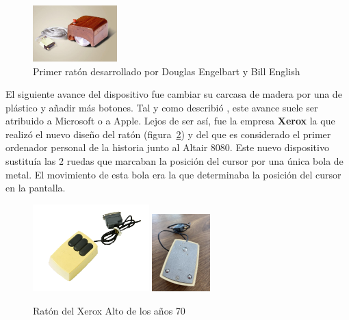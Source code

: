 \begin{figure}[t]
\centering
\includegraphics[width=0.29\textwidth]{./Imagenes/Bitmap/Primer_raton.jpg}
\caption{Primer rat\'on desarrollado por Douglas Engelbart y Bill English}
\label{Fig:primerraton}
\end{figure}

El siguiente avance del dispositivo fue cambiar su carcasa de madera por una de pl\'astico y a\~nadir m\'as botones. Tal y como describi\'o \cite{xerox}, este avance suele ser atribuido a Microsoft o a Apple. Lejos de ser as\'i, fue la empresa \textbf{Xerox} la que realiz\'o el nuevo dise\~no del rat\'on (figura~\ref{Fig:xerox}) y del que es considerado el primer ordenador personal de la historia junto al Altair 8080. Este nuevo dispositivo sustitu\'ia las 2 ruedas que marcaban la posici\'on del cursor por una \'unica bola de metal. El movimiento de esta bola era la que determinaba la posici\'on del cursor en la pantalla. \\

\begin{figure}[t]
\begin{minipage}{0.9\textwidth}
    \centering
    \includegraphics[width=0.40\textwidth]{./Imagenes/Bitmap/mouse_xerox_alto(1).png}
    \includegraphics[width=0.20\textwidth]{./Imagenes/Bitmap/mouse_xerox_alto(2).jpg}
\end{minipage}
    \caption{Rat\'on del Xerox Alto de los a\~nos 70}
\label{Fig:xerox}
\end{figure}

